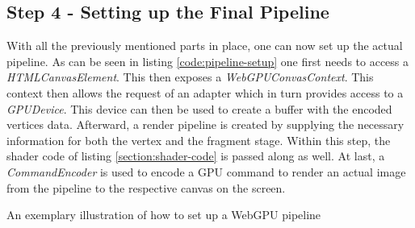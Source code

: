 \subsection{Step 4 - Setting up the Final Pipeline}

With all the previously mentioned parts in place, one can now set up the actual pipeline. As can be seen in listing \ref*{code:pipeline-setup} one first needs to access a \emph{HTMLCanvasElement}. This 
then exposes a \emph{WebGPUConvasContext}. This context then allows the request of an adapter which in turn provides access to a \emph{GPUDevice}.
This device can then be used to create a buffer with the encoded vertices data. Afterward, a render pipeline is created by supplying the necessary information for both the vertex and the fragment stage.
Within this step, the shader code of listing \ref*{section:shader-code} is passed along as well. At last, a \emph{CommandEncoder} is used to encode a GPU command to render an actual image from the pipeline to the respective canvas on the screen. 

\begin{listing}

  \centering

  \caption[Code Snippet: WebGPU Pipeline]
  {
    An exemplary illustration of how to set up a WebGPU pipeline
  }
  \label{code:pipeline-setup}
\end{listing}

